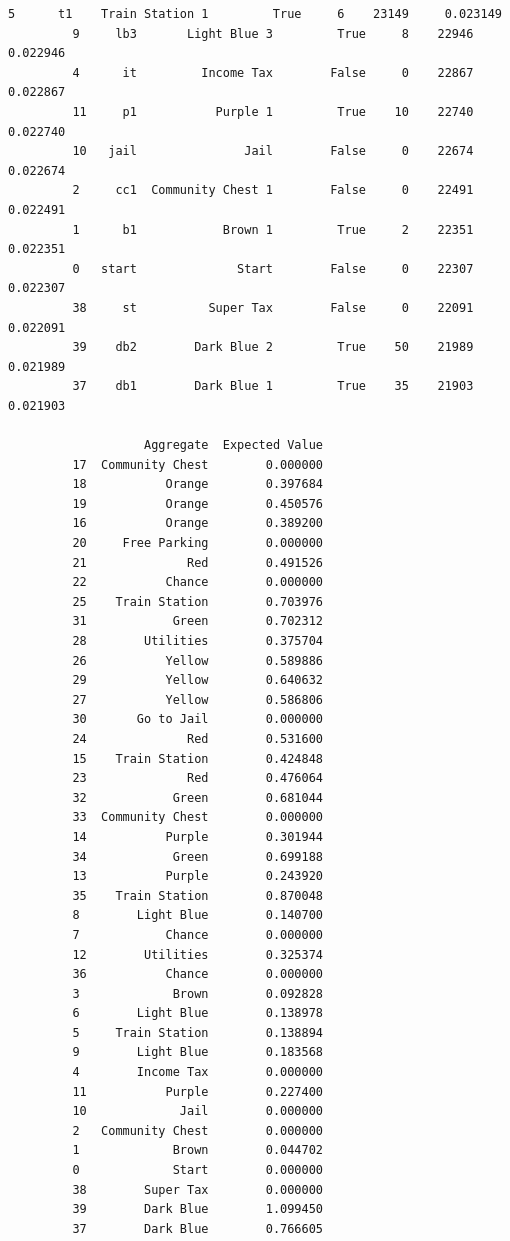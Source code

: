 \documentclass[11pt]{article}
\begin{document}
\begin{Verbatim}[commandchars=\\\{\}]
         5      t1    Train Station 1         True     6    23149     0.023149   
         9     lb3       Light Blue 3         True     8    22946     0.022946   
         4      it         Income Tax        False     0    22867     0.022867   
         11     p1           Purple 1         True    10    22740     0.022740   
         10   jail               Jail        False     0    22674     0.022674   
         2     cc1  Community Chest 1        False     0    22491     0.022491   
         1      b1            Brown 1         True     2    22351     0.022351   
         0   start              Start        False     0    22307     0.022307   
         38     st          Super Tax        False     0    22091     0.022091   
         39    db2        Dark Blue 2         True    50    21989     0.021989   
         37    db1        Dark Blue 1         True    35    21903     0.021903   
         
                   Aggregate  Expected Value  
         17  Community Chest        0.000000  
         18           Orange        0.397684  
         19           Orange        0.450576  
         16           Orange        0.389200  
         20     Free Parking        0.000000  
         21              Red        0.491526  
         22           Chance        0.000000  
         25    Train Station        0.703976  
         31            Green        0.702312  
         28        Utilities        0.375704  
         26           Yellow        0.589886  
         29           Yellow        0.640632  
         27           Yellow        0.586806  
         30       Go to Jail        0.000000  
         24              Red        0.531600  
         15    Train Station        0.424848  
         23              Red        0.476064  
         32            Green        0.681044  
         33  Community Chest        0.000000  
         14           Purple        0.301944  
         34            Green        0.699188  
         13           Purple        0.243920  
         35    Train Station        0.870048  
         8        Light Blue        0.140700  
         7            Chance        0.000000  
         12        Utilities        0.325374  
         36           Chance        0.000000  
         3             Brown        0.092828  
         6        Light Blue        0.138978  
         5     Train Station        0.138894  
         9        Light Blue        0.183568  
         4        Income Tax        0.000000  
         11           Purple        0.227400  
         10             Jail        0.000000  
         2   Community Chest        0.000000  
         1             Brown        0.044702  
         0             Start        0.000000  
         38        Super Tax        0.000000  
         39        Dark Blue        1.099450  
         37        Dark Blue        0.766605  
\end{Verbatim}
            
\end{document}
